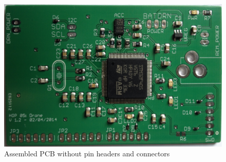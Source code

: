 \documentclass[a4paper]{article}        %
\begin{document}
  \begin{figure}
    \begin{center}
      \includegraphics[width=\textwidth]{images/final_pcb_result.eps}
      \caption{Assembled PCB without pin headers and connectors}
      \label{fig:final_pcb}
    \end{center}
  \end{figure}
  
\end{document}
